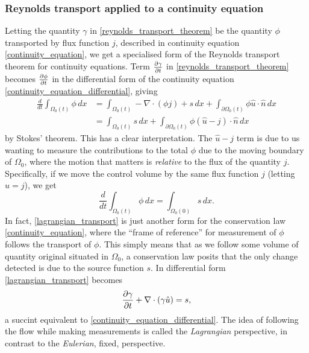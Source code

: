 \subsubsection{Reynolds transport applied to a continuity equation}
Letting the quantity $\gamma$ in \eqref{reynolds_transport_theorem} be the quantity $\phi$ transported by flux function $j$,
described in continuity equation \eqref{continuity_equation}, we get a specialised form of the Reynolds transport theorem for continuity equations.
Term $\frac{\partial \gamma}{\partial t}$ in \eqref{reynolds_transport_theorem} becomes $\frac{\partial \phi}{\partial t}$ in the differential form of the continuity equation \eqref{continuity_equation_differential}, giving
\begin{equation}\label{reynolds_transport_continuity_equation}
\begin{split}
    \frac{d}{dt}\int_{\Omega_0(t)}\phi\,dx
        &= \int_{\Omega_0(t)}-\nabla\cdot(\phi j) + s\,dx + \int_{\partial\Omega_0(t)}\phi \hat{u}\cdot\hat{n} \,dx \\
        &= \int_{\Omega_0(t)}s\,dx + \int_{\partial\Omega_0(t)}\phi (\hat{u} - j)\cdot\hat{n} \,dx
\end{split}
\end{equation}
by Stokes' theorem. This has a clear interpretation.
The $\hat{u} - j$ term is due to us wanting to measure the contributions to the total $\phi$ due to the moving boundary of
$\Omega_0$, where the motion that matters is \textit{relative} to the flux of the quantity $j$. Specifically, if we move the control volume by
the same flux function $j$ (letting $\hat{u} = j$), we get
\begin{equation}\label{lagrangian_transport}
    \frac{d}{dt}\int_{\Omega_0(t)}\phi\,dx
        = \int_{\Omega_0(0)}s\,dx.
\end{equation}
In fact, \eqref{lagrangian_transport} is just another form for the conservation law \eqref{continuity_equation},
where the ``frame of reference'' for measurement of $\phi$ follows the transport of $\phi$. This simply means that as we follow some volume of quantity
original situated in $\Omega_0$, a conservation law posits that the only change detected is due to the source function $s$. In differential form
\eqref{lagrangian_transport} becomes
\begin{equation}\label{lagrangian_transport_differential}
    \frac{\partial \gamma}{\partial t} + \nabla \cdot(\gamma \hat{u}) = s,
\end{equation}
a succint equivalent to \eqref{continuity_equation_differential}.
The idea of following the flow while making measurements is called the \textit{Lagrangian} perspective, in contrast to the \textit{Eulerian}, fixed, perspective.
